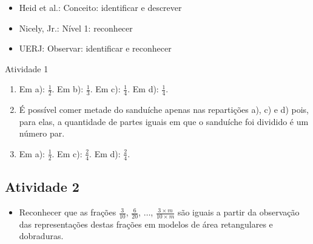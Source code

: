 \begin{multicols}{2}
 \vspace{.1cm}
 
\begin{itemize} %
    \item       Heid et al.: Conceito: identificar e descrever
    \item       Nicely, Jr.: Nível 1: reconhecer
    \item       UERJ: Observar: identificar e reconhecer
\end{itemize} %
  

\begin{resposta*}{Atividade 1}  
\begin{enumerate} [\quad a)] %
    \item       Em a):       $\frac{1}{2}$. Em b):       $\frac{1}{3}$. Em c):   
    $\frac{1}{4}$. Em d):       $\frac{1}{4}$.
    \item       É possível comer metade do sanduíche apenas nas repartições a), 
c) e d) pois, para elas, a quantidade de partes iguais em que o sanduíche foi 
dividido é um número par.
    \item       Em a):       $\frac{1}{2}$. Em c):       $\frac{2}{4}$. Em d):   
    $\frac{2}{4}$.
\end{enumerate} %
  
\end{resposta*}





\subsection{Atividade 2}

\begin{itemize} %
    \item       Reconhecer que as frações       $\frac{3}{10}$,       
$\frac{6}{20}$,       $\ldots$,       $\frac{3 \times m}{10 \times m}$       são 
iguais a partir da observação das representações destas frações em modelos de 
área retangulares e dobraduras. 
\end{itemize} %
  
  
 

\end{multicols}
